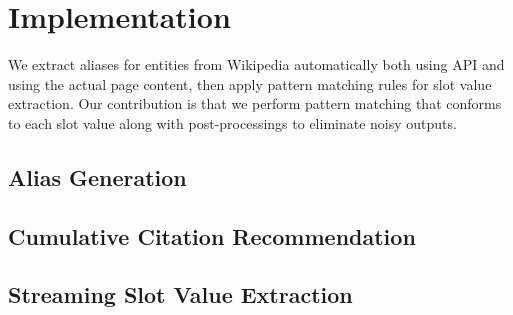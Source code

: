 

\section{Implementation}
\label{section:implementation}

We extract aliases for entities from Wikipedia automatically both using API and using the actual page content, then apply pattern matching rules for slot value extraction. Our contribution is that we perform pattern matching that conforms to each slot value along with post-processings to eliminate noisy outputs. 


\subsection{Alias Generation}
\label{section:aliasgeneration}


\subsection{Cumulative Citation Recommendation}
\label{sec:ccrimpl}





\subsection{Streaming Slot Value Extraction}













